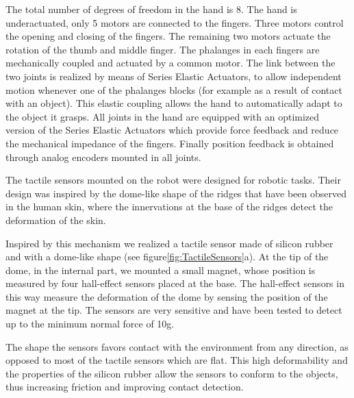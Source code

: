
The total number of degrees of freedom in the hand is 8. The hand
is underactuated, only 5 motors are connected to the fingers.
Three motors control the opening and closing of the fingers. The
remaining two motors actuate the rotation of the thumb and middle
finger. The phalanges in each fingers are mechanically coupled and
actuated by a common motor. The link between the two joints is
realized by means of Series Elastic Actuators, to allow
independent motion whenever one of the phalanges blocks (for
example as a result of contact with an object). This elastic
coupling allows the hand to automatically adapt to the object it
grasps. All joints in the hand are equipped with an optimized
version of the Series Elastic Actuators \cite{actuator} which
provide force feedback and reduce the mechanical impedance of the
fingers. Finally position feedback is obtained through analog
encoders mounted in all joints.


The tactile sensors mounted on the robot were designed for robotic tasks.
Their design was inspired by the dome-like shape of the ridges that have been
observed in the human skin, where the innervations at the base of the ridges
detect the deformation of the skin.

Inspired by this mechanism we realized a tactile sensor made of
silicon rubber and with a dome-like shape (see
figure\ref{fig:TactileSensors}a). At the tip of the dome, in the
internal part, we mounted a small magnet, whose position is
measured by four hall-effect sensors placed at the base. The
hall-effect sensors in this way measure the deformation of the
dome by sensing the position of the magnet at the tip. The sensors
are very sensitive and have been tested to detect up to the
minimum normal force of 10g.

The shape the sensors favors contact with the environment from any direction,
as opposed to most of the tactile sensors which are flat.
This high deformability and the properties of the silicon rubber allow the
sensors to conform to the objects, thus increasing friction and improving
contact detection.

